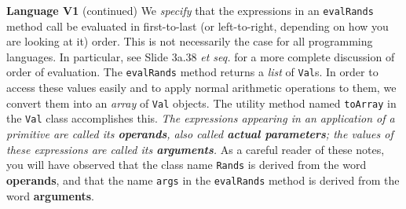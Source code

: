 \begin{minipage}[t]{\sw}
\slidenumber
\LARGE
{\bf Language V1} (continued)\exx
We {\em specify} that the expressions
in an \verb'evalRands' method call be evaluated
in first-to-last (or left-to-right, depending on how you are looking at it) order.
This is not necessarily the case for all programming languages.
In particular, 
see Slide 3a.38 {\em et seq.} for a more complete discussion
of order of evaluation.\exx
The \verb'evalRands' method returns a {\em list} of \verb'Val's.
In order to access these values easily and
to apply normal arithmetic operations to them,
we convert them into an {\em array} of \verb'Val' objects.
The utility method named \verb'toArray' in the \verb'Val' class
accomplishes this.\exx
{\em The expressions appearing in an application of a primitive
are called its {\bf operands},
also called {\bf actual parameters};
the values of these expressions are called its {\bf arguments}.}\exx
As a careful reader of these notes,
you will have observed that the class name \verb'Rands'
is derived from the word {\bf operands},
and that the name \verb'args' in the \verb'evalRands' method
is derived from the word {\bf arguments}.
\end{minipage}
\clearpage
